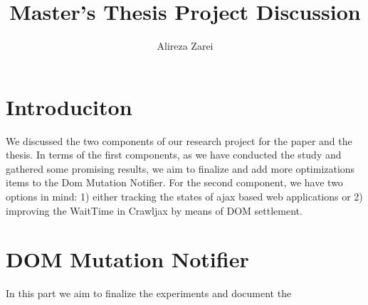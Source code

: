 \documentclass[11pt]{amsart}
\title{Master's Thesis Project Discussion}
\author{Alireza Zarei}
\begin{document}
\maketitle


\section{Introduciton}

We discussed the two components of our research project for the paper and the thesis. In terms of the first components, as we have conducted the study and gathered some promising results, we aim to finalize and add more optimizations items to the Dom Mutation Notifier. For the second component, we have two options in mind: 1) either tracking the states of ajax based web applications or 2) improving the WaitTime in Crawljax by means of DOM settlement.

\section{DOM Mutation Notifier}

In this part we aim to finalize the experiments and document the 
\end{document}
